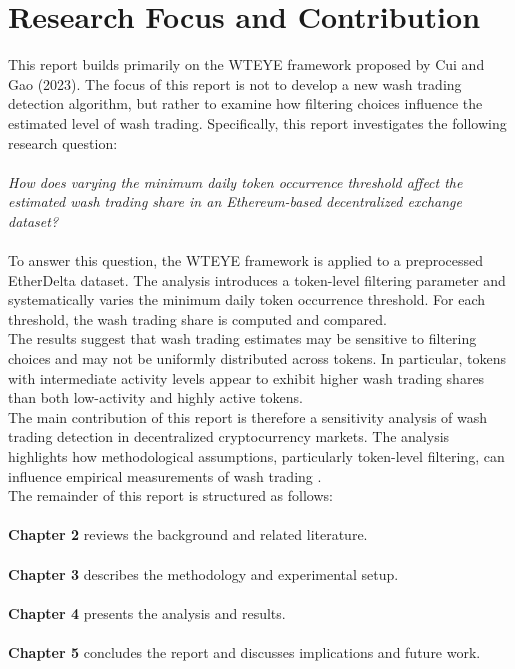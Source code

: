 \documentclass[language=english,thesis=bachelor,nosecondtitle,faculty=cb,onesided,13pt]{hsmw-thesis}
\begin{document}
	\section{Research Focus and Contribution}
This report builds primarily on the WTEYE framework proposed by Cui and Gao (2023). The focus of this report is not to develop a new wash trading detection algorithm, but rather to examine how filtering choices influence the estimated level of wash trading.
Specifically, this report investigates the following research question: \\
\\
\textit{How does varying the minimum daily token occurrence threshold affect the estimated wash trading share in an Ethereum-based decentralized exchange dataset?} \\
\\
To answer this question, the WTEYE framework is applied to a preprocessed EtherDelta dataset. The analysis introduces a token-level filtering parameter and systematically varies the minimum daily token occurrence threshold. For each threshold, the wash trading share is computed and compared. \\
The results suggest that wash trading estimates may be sensitive to filtering choices and may not be uniformly distributed across tokens. In particular, tokens with intermediate activity levels appear to exhibit higher wash trading shares than both low-activity and highly active tokens. \\
The main contribution of this report is therefore a sensitivity analysis of wash trading detection in decentralized cryptocurrency markets. The analysis highlights how methodological assumptions, particularly token-level filtering, can influence empirical measurements of wash trading \cite{victor2021detecting, cui2023chain}. \\
The remainder of this report is structured as follows:\\
\\
\textbf{Chapter 2} reviews the background and related literature.\\
\\
\textbf{Chapter 3} describes the methodology and experimental setup. \\
\\
\textbf{Chapter 4} presents the analysis and results.\\
\\ 
\textbf{Chapter 5} concludes the report and discusses implications and future work.
\end{document}
